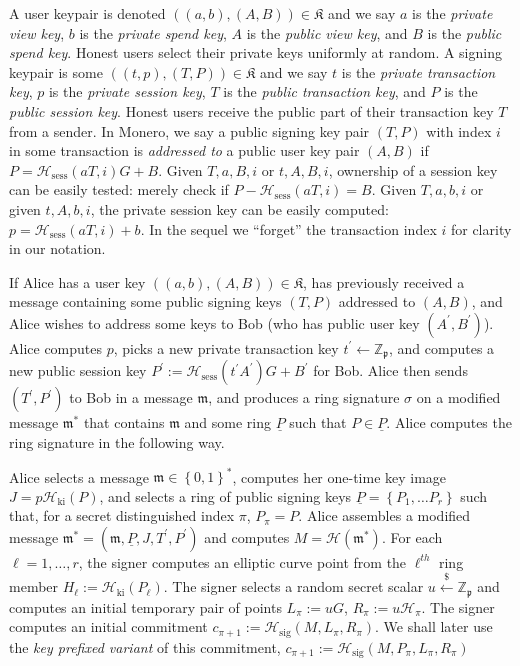 \documentclass{mrl}
\theoremstyle{definition}
\numberwithin{theorem}{subsection}
\newcommand{\scalarField}{\mathbb{Z}_{\mathfrak{p}}}
\newcommand{\m}{\mathfrak{m}}
\begin{document}
A user keypair is denoted $((a,b),(A,B)) \in  \mathfrak{K}$ and we say $a$ is the \textit{private view key}, $b$ is the \textit{private spend key}, $A$ is the \textit{public view key}, and $B$ is the \textit{public spend key}. Honest users select their private keys uniformly at random. A signing keypair is some  $((t,p),(T,P)) \in \mathfrak{K}$ and we say $t$ is the \textit{private transaction key}, $p$ is the \textit{private session key}, $T$ is the \textit{public transaction key}, and $P$ is the \textit{public session key}. Honest users receive the public part of their transaction key $T$ from a sender. In Monero, we say a public signing key pair $(T,P)$ with index $i$ in some transaction is \textit{addressed to} a public user key pair $(A,B)$ if $P = \mathcal{H}_{\text{sess}}(aT, i)G + B$. Given $T, a, B, i$ or $t, A, B, i$, ownership of a session key can be easily tested: merely check if $P - \mathcal{H}_{\text{sess}}(aT, i) = B$. Given $T, a, b, i$ or given $t, A, b, i$, the private session key can be easily computed: $p = \mathcal{H}_{\text{sess}}(aT, i) + b$.  In the sequel we ``forget'' the transaction index $i$ for clarity in our notation.

If Alice has a user key $((a,b),(A,B)) \in  \mathfrak{K}$, has previously received a message containing some public signing keys $(T, P)$ addressed to $(A,B)$, and Alice wishes to address some keys to Bob (who has public user key $(A^{\prime}, B^{\prime})$). Alice computes $p$, picks a new private transaction key $t^{\prime} \leftarrow \scalarField$, and computes a new public session key $P^{\prime} := \mathcal{H}_{\text{sess}}(t^{\prime} A^{\prime})G + B^\prime$ for Bob. Alice then sends $(T^{\prime}, P^{\prime})$ to Bob in a message $\m$, and produces a ring signature $\sigma$ on a modified message $\m^*$ that contains $\m$ and some ring $\underline{P}$ such that $P \in \underline{P}$. Alice computes the ring signature in the following way.

Alice selects a message $\m \in \left\{0,1\right\}^*$, computes her one-time key image $J = p\mathcal{H}_{\text{ki}}(P)$, and selects a ring of public signing keys $\underline{P}=\left\{P_1, \ldots P_r\right\}$ such that, for a secret distinguished index $\pi$, $P_{\pi}=P$.  Alice assembles a modified message $\m^* = (\m, \underline{P}, J, T^{\prime}, P^{\prime})$ and computes $M = \mathcal{H}(\m^*)$. For each $\ell=1,\ldots,r$, the signer computes an elliptic curve point from the $\ell^{th}$ ring member $H_\ell := \mathcal{H}_{\text{ki}}(P_\ell)$. The signer selects a random secret scalar $u \overset{\$}{\leftarrow} \scalarField$ 
and computes an initial temporary pair of points $L_{\pi} := uG$,  $R_{\pi} := u\mathcal{H}_{\pi}$. The signer computes an initial commitment $c_{\pi+1} := \mathcal{H}_{\text{sig}}(M,L_{\pi}, R_{\pi})$. We shall later use the \textit{key prefixed variant} of this commitment, $c_{\pi+1} := \mathcal{H}_{\text{sig}}(M,P_\pi, L_{\pi}, R_{\pi})$
\end{document}
